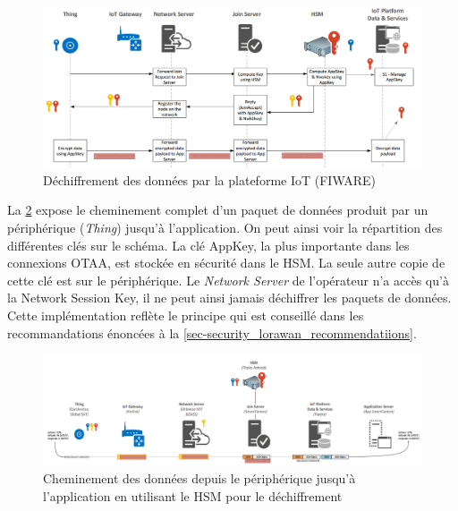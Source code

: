 \begin{figure}[ht!]
    \centering
    \includegraphics[width=1.0\textwidth]{Figures/Security/smartcanton/smartcanton_joinserver_decrypt_fiware.png}
    \caption{Déchiffrement des données par la plateforme IoT (FIWARE)}
    \label{fig-smartcanton_joinserver_decrypt_fiware}
\end{figure}


La \cref{fig-payload_journey} expose le cheminement complet d'un paquet de données produit par un périphérique (\textit{Thing}) jusqu'à l'application. On peut ainsi voir la répartition des différentes clés sur le schéma. La clé AppKey, la plus importante dans les connexions OTAA, est stockée en sécurité dans le HSM. La seule autre copie de cette clé est sur le périphérique. Le \textit{Network Server} de l'opérateur n'a accès qu'à la Network Session Key, il ne peut ainsi jamais déchiffrer les paquets de données. Cette implémentation reflète le principe qui est conseillé dans les recommandations énoncées à la \cref{sec-security_lorawan_recommendatiions}.

\begin{figure}[ht!]
    \centering
    \includegraphics[width=1.0\textwidth]{Figures/Security/smartcanton/payload_journey.png}
    \caption{Cheminement des données depuis le périphérique jusqu'à l'application en utilisant le HSM pour le déchiffrement}
    \label{fig-payload_journey}
\end{figure}



